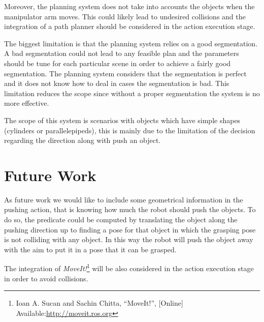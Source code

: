 Moreover, the planning system does not take into accounts the objects when the manipulator arm moves. This could likely lead to undesired collisions and the integration of a  path planner should be considered in the action execution stage.  

The biggest limitation is that the planning system relies on a good segmentation. A bad segmentation could not lead to any feasible plan and the parameters should be tune for each particular scene in order to achieve a fairly good segmentation. The planning system considers that the segmentation  is perfect and it does not know how to deal in cases the segmentation is bad. This limitation reduces the scope since without a proper segmentation the system is no more effective. 

The scope of this system  is  scenarios with objects which have simple shapes (cylinders or parallelepipeds), this is mainly due to the limitation of the decision regarding the direction along with push an object.  


\section*{Future Work}
As future work we would like to include some geometrical information in the pushing action, that is knowing how much the robot should push the objects. To do so, the  predicate could be computed by translating the object along the pushing direction up to finding a pose for that object in which the grasping pose is not colliding with any object. In this way the robot will push the object away with the aim to put it in a pose that it can be grasped.

The integration of \textit{MoveIt!}\footnote{Ioan A. Sucan and Sachin Chitta, “MoveIt!”, [Online] Available:\href{http://moveit.ros.org} {\url{http://moveit.ros.org}}} will be also considered in the action execution stage in order to avoid  collisions. 

